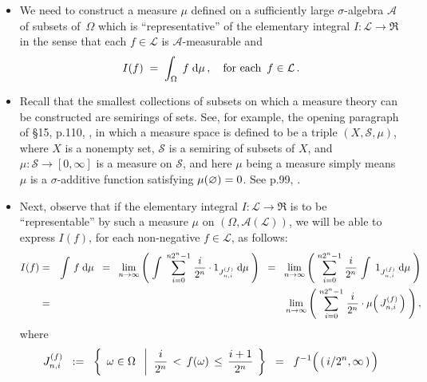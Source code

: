 \vskip 0.5cm
\proofoutline
\begin{itemize}
\item
	We need to construct a measure $\mu$ defined on a sufficiently large
	$\sigma$-algebra $\mathcal{A}$ of subsets of \,$\Omega$
	which is ``representative'' of the elementary integral
	$I : \mathcal{L} \longrightarrow \Re$ in the sense that each $f \in \mathcal{L}$
	is $\mathcal{A}$-measurable and
	\begin{equation*}
	I(f) \; = \; \int_{\Omega}\; f \;\textnormal{d}\mu\,,
	\quad\textnormal{for each \,$f \in \mathcal{L}$}\,.
	\end{equation*}
\item
	Recall that the smallest collections of subsets on which a measure theory can be constructed
	are {\color{red}semirings} of sets.
	See, for example, the opening paragraph of \S15, p.110, \cite{Aliprantis1998},
	in which a measure space is defined to be a triple $(X,\mathcal{S},\mu)$, where
	$X$ is a nonempty set, $\mathcal{S}$ is a semiring of subsets of $X$, and
	$\mu:\mathcal{S}\longrightarrow [0,\infty]$ is a measure on $\mathcal{S}$,
	and here $\mu$ being a measure simply means $\mu$ is a $\sigma$-additive function
	satisfying $\mu(\varnothing) = 0$. See p.99, \cite{Aliprantis1998}.
\item
	Next, observe that if the elementary integral $I : \mathcal{L} \longrightarrow \Re$
	is to be ``representable'' by such a measure $\mu$ on $(\Omega,\mathcal{A}(\mathcal{L}))$,
	we will be able to express $I(f)$, for each non-negative $f \in \mathcal{L}$, as follows:
	\begin{eqnarray*}
	I(f)
	& = &
		\int\, f \;\textnormal{d}\mu
	\;\; = \;\;
		\underset{n\rightarrow\infty}{\lim}
		\left(\;
			\int\;
			\overset{n2^{n}-1}{\underset{i=0}{\sum}}\; \dfrac{i}{2^{n}} \cdot 1_{J^{(f)}_{n,i}}
			\;\textnormal{d}\mu
		\;\right)
	\;\; = \;\;
		\underset{n\rightarrow\infty}{\lim}
		\left(\;
			\overset{n2^{n}-1}{\underset{i=0}{\sum}}\; \dfrac{i}{2^{n}}\,
			\int\; 1_{J^{(f)}_{n,i}} \;\textnormal{d}\mu
		\;\right)
	\\
	& = &
		\underset{n\rightarrow\infty}{\lim}
		\left(\;
			\overset{n2^{n}-1}{\underset{i=0}{\sum}}\; \dfrac{i}{2^{n}} \cdot \mu\!\left(\,J^{(f)}_{n,i}\,\right)
		\;\right),
	\end{eqnarray*}
	where
	\begin{equation*}
	J^{(f)}_{n,i}
	\;\; := \;\;
		\left\{\;\,
			\omega \in \Omega
		\;\;\left\vert\;\;
			\dfrac{i}{2^{n}} \,<\, f(\omega) \,\leq\, \dfrac{i+1}{2^{n}}
		\right.
		\;\right\}
	\;\; = \;\;
		f^{-1}\!\left(\,(\,i/2^{n}\overset{{\color{white}\vert}}{,}\,\infty\,)\,\right)

\end{equation*}
\end{itemize}
